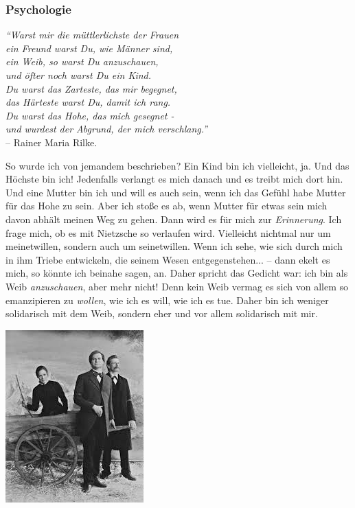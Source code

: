 \documentclass[12pt, a4paper, openany]{report}
\begin{document}
\subsubsection{Psychologie}
\begin{center}
  \textit{
    ``Warst mir die müttlerlichste der Frauen\\
    ein Freund warst Du, wie Männer sind,\\
    ein Weib, so warst Du anzuschauen,\\
    und öfter noch warst Du ein Kind.\\
    Du warst das Zarteste, das mir begegnet,\\
    das Härteste warst Du, damit ich rang.\\
    Du warst das Hohe, das mich gesegnet -\\
    und wurdest der Abgrund, der mich verschlang.''\\
  }
  \medskip
  -- Rainer Maria Rilke.\\
\end{center}
So wurde ich von jemandem beschrieben? 
Ein Kind bin ich vielleicht, ja.
Und das Höchste bin ich! 
Jedenfalls verlangt es mich danach und es treibt mich dort hin.
Und eine Mutter bin ich und will es auch sein, wenn ich das Gefühl habe Mutter für das Hohe zu sein. 
Aber ich stoße es ab, wenn Mutter für etwas sein mich davon abhält meinen Weg zu gehen. 
Dann wird es für mich zur \emph{Erinnerung}. 
Ich frage mich, ob es mit Nietzsche so verlaufen wird. 
Vielleicht nichtmal nur um meinetwillen, sondern auch um seinetwillen. 
Wenn ich sehe, wie sich durch mich in ihm Triebe entwickeln, die seinem Wesen entgegenstehen... -- dann ekelt es mich, so könnte ich beinahe sagen, an.
Daher spricht das Gedicht war:
ich bin als Weib \emph{anzuschauen}, aber mehr nicht! 
Denn kein Weib vermag es sich von allem so emanzipieren zu \emph{wollen}, wie ich es will, wie ich es tue.
Daher bin ich weniger solidarisch mit dem Weib, sondern eher und vor allem solidarisch mit mir.
\bigskip
\begin{center}
  \includegraphics[scale=0.7]{lou.jpeg}
\end{center}
\end{document}
